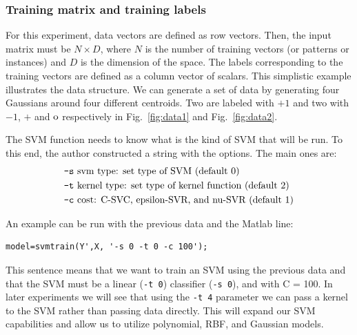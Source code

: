 \documentclass[journal]{IEEEtran}
\begin{document}
\subsubsection{Training matrix and training labels}

For this experiment, data vectors are defined as row vectors. Then, the input matrix must be \( N \times D\), where \( N \) is the number of training vectors (or patterns or instances) and \( D \) is the dimension of the space. The labels corresponding to the training vectors are defined as a column vector of scalars.
This simplistic example illustrates the data structure. We can generate a set of data by generating four Gaussians around four different centroids. Two are labeled with \(+1 \) and two with \( -1 \), \( + \) and \( \rm{o} \) respectively in Fig.~\ref{fig:data1} and Fig.~\ref{fig:data2}.

The SVM function needs to know what is the kind of SVM that will be run. To this end, the author constructed a string with the options. The main ones are:
\begin{align}
    \notag \texttt{-s} &\text{ svm type: set type of SVM (default 0)}\\
    \notag \texttt{-t} &\text{ kernel type: set type of kernel function (default 2)}\\
    \notag \texttt{-c} &\text{ cost: C-SVC, epsilon-SVR, and nu-SVR (default 1)}
\end{align}

An example can be run with the previous data and the Matlab line:
\begin{verbatim}
model=svmtrain(Y',X, '-s 0 -t 0 -c 100');
\end{verbatim}

This sentence means that we want to train an SVM using the previous data and that the SVM must be a linear (\texttt{-t 0}) classifier (\texttt{-s 0}), and with C = 100. In later experiments we will see that using the \texttt{-t 4} parameter we can pass a kernel to the SVM rather than passing data directly. This will expand our SVM capabilities and allow us to utilize polynomial, RBF, and Gaussian models.
\end{document}
